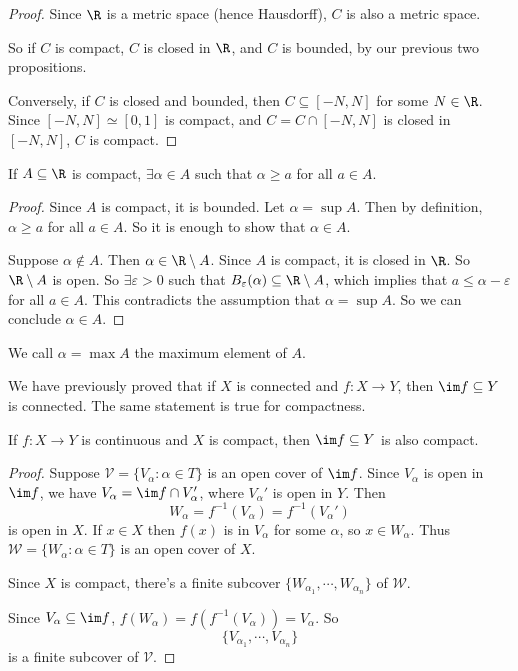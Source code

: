 \documentclass[a4paper]{article}
\begin{document}
\begin{proof}
   Since $\R$ is a metric space (hence Hausdorff), $C$ is also a metric space.

  So if $C$ is compact, $C$ is closed in $\R$, and $C$ is bounded, by our previous two propositions.

  Conversely, if $C$ is closed and bounded, then $C\subseteq [-N, N]$ for some $N\in \R$. Since $[-N, N] \simeq [0, 1]$ is compact, and $C = C\cap [-N, N]$ is closed in $[-N, N]$, $C$ is compact.
\end{proof}

\begin{cor}
  If $A\subseteq \R$ is compact, $\exists \alpha \in A$ such that $\alpha \geq a$ for all $a\in A$.
\end{cor}

\begin{proof}
  Since $A$ is compact, it is bounded. Let $\alpha = \sup A$. Then by definition, $\alpha \geq a$ for all $a\in A$. So it is enough to show that $\alpha \in A$.

  Suppose $\alpha \not\in A$. Then $\alpha \in \R \setminus A$. Since $A$ is compact, it is closed in $\R$. So $\R \setminus A$ is open. So $\exists \varepsilon > 0$ such that $B_\varepsilon(\alpha) \subseteq \R\setminus A$, which implies that $a \leq \alpha - \varepsilon$ for all $a\in A$. This contradicts the assumption that $\alpha = \sup A$. So we can conclude $\alpha\in A$.
\end{proof}

We call $\alpha = \max A$ the maximum element of $A$.

We have previously proved that if $X$ is connected and $f: X\to Y$, then $\im f\subseteq Y$ is connected. The same statement is true for compactness.
\begin{prop}
  If $f: X \to Y$ is continuous and $X$ is compact, then $\im f \subseteq Y$ is also compact.
\end{prop}

\begin{proof}
  Suppose $\mathcal{V} = \{V_\alpha: \alpha \in T\}$ is an open cover of $\im f$. Since $V_\alpha$ is open in $\im f$, we have $V_\alpha = \im f\cap V_\alpha'$, where $V_\alpha'$ is open in $Y$. Then
  \[
    W_\alpha = f^{-1}(V_\alpha) = f^{-1}(V_\alpha')
  \]
  is open in $X$. If $x\in X$ then $f(x)$ is in $V_\alpha$ for some $\alpha$, so $x\in W_\alpha$. Thus $\mathcal{W} = \{W_\alpha: \alpha \in T\}$ is an open cover of $X$.

  Since $X$ is compact, there's a finite subcover $\{W_{\alpha_1}, \cdots, W_{\alpha_n}\}$ of $\mathcal{W}$.

  Since $V_\alpha \subseteq \im f$, $f(W_\alpha) = f(f^{-1}(V_\alpha)) = V_\alpha$. So
  \[
    \{V_{\alpha_1}, \cdots, V_{\alpha_n}\}
  \]
  is a finite subcover of $\mathcal{V}$.
\end{proof}
\end{document}

